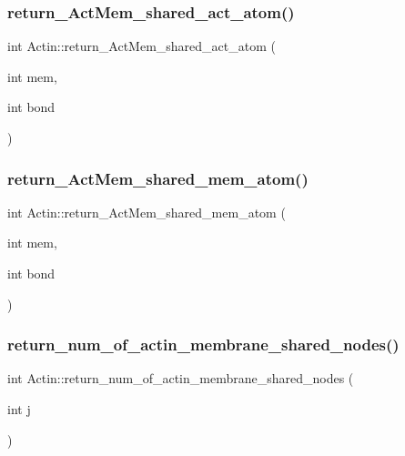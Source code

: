 \subsubsection{\texorpdfstring{return\_ActMem\_shared\_act\_atom()}{return\_ActMem\_shared\_act\_atom()}}
{\footnotesize\ttfamily int Actin\+::return\+\_\+\+Act\+Mem\+\_\+shared\+\_\+act\+\_\+atom (\begin{DoxyParamCaption}\item[{int}]{mem,  }\item[{int}]{bond }\end{DoxyParamCaption})\hspace{0.3cm}{\ttfamily [inline]}}

\mbox{\label{classActin_afc71b2d84af65834f2ca7390d8bd974f}} 
\subsubsection{\texorpdfstring{return\_ActMem\_shared\_mem\_atom()}{return\_ActMem\_shared\_mem\_atom()}}
{\footnotesize\ttfamily int Actin\+::return\+\_\+\+Act\+Mem\+\_\+shared\+\_\+mem\+\_\+atom (\begin{DoxyParamCaption}\item[{int}]{mem,  }\item[{int}]{bond }\end{DoxyParamCaption})\hspace{0.3cm}{\ttfamily [inline]}}

\mbox{\label{classActin_ad6b6cfbc32c772aa024eafa5caea16ab}} 
\subsubsection{\texorpdfstring{return\_num\_of\_actin\_membrane\_shared\_nodes()}{return\_num\_of\_actin\_membrane\_shared\_nodes()}}
{\footnotesize\ttfamily int Actin\+::return\+\_\+num\+\_\+of\+\_\+actin\+\_\+membrane\+\_\+shared\+\_\+nodes (\begin{DoxyParamCaption}\item[{int}]{j }\end{DoxyParamCaption})\hspace{0.3cm}{\ttfamily [inline]}}

